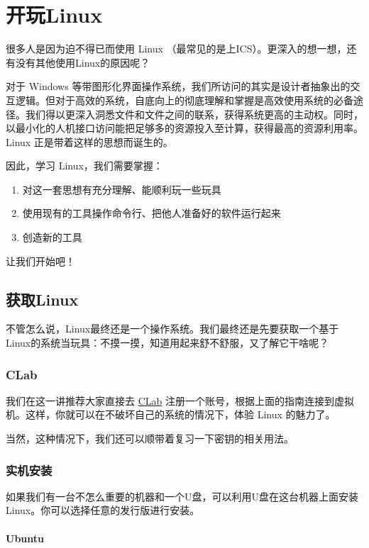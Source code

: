 \documentclass[../main.tex]{subfiles}
\begin{document}
\chapter{开玩Linux}\label{chap:play-with-linux}

很多人是因为迫不得已而使用 Linux \faLinux（最常见的是上ICS）。更深入的想一想，还有没有其他使用Linux的原因呢？

对于 Windows 等带图形化界面操作系统，我们所访问的其实是设计者抽象出的交互逻辑。但对于高效的系统，自底向上的彻底理解和掌握是高效使用系统的必备途径。我们得以更深入洞悉文件和文件之间的联系，获得系统更高的主动权。同时，以最小化的人机接口访问能把足够多的资源投入至计算，获得最高的资源利用率。Linux 正是带着这样的思想而诞生的。

因此，学习 Linux，我们需要掌握：

\begin{enumerate}
  \item 对这一套思想有充分理解、能顺利玩一些玩具
  \item 使用现有的工具操作命令行、把他人准备好的软件运行起来
  \item 创造新的工具
\end{enumerate}

让我们开始吧！

\section{获取Linux}

不管怎么说，Linux最终还是一个操作系统。我们最终还是先要获取一个基于Linux的系统当玩具：不摸一摸，知道用起来舒不舒服，又了解它干啥呢？

\subsection{CLab}

我们在这一讲推荐大家直接去 \href{https://clab.pku.edu.cn/}{CLab} 注册一个账号，根据上面的指南连接到虚拟机。这样，你就可以在不破坏自己的系统的情况下，体验 Linux 的魅力了。

当然，这种情况下，我们还可以顺带着复习一下密钥的相关用法。

\subsection{实机安装}

如果我们有一台不怎么重要的机器和一个U盘，可以利用U盘在这台机器上面安装Linux。你可以选择任意的发行版进行安装。

\subsubsection{Ubuntu}
\end{document}
